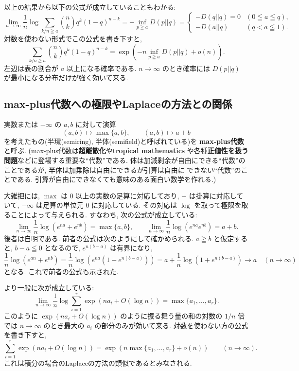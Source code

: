 \documentclass[12pt,twoside]{jarticle}
\theoremstyle{jplain}
\theoremstyle{jplain}
\theoremstyle{jplain}
\numberwithin{theorem}{section}
\numberwithin{equation}{section}
\numberwithin{figure}{section}
\numberwithin{table}{section}
\begin{document}
以上の結果から以下の公式が成立していることもわかる:
\[
\lim_{n\to\infty}
\frac{1}{n}\log\sum_{k/n\geqq a} \binom{n}{k}q^k(1-q)^{n-k}
=-\inf_{p\geqq a} D(p||q)
=
\begin{cases}
-D(q||q)=0 & (0\leqq a\leqq q), \\
-D(a||q)   & (q<a\leqq 1).
\end{cases}
\]
対数を使わない形式でこの公式を書き下すと,
\[
\sum_{k/n\geqq a} \binom{n}{k}q^k(1-q)^{n-k}
=
\exp\left(-n\inf_{p\geqq a}D(p||q) + o(n)\right).
\]
左辺は表の割合が $a$ 以上になる確率である.
$n\to\infty$ のとき確率には $D(p||q)$ が最小になる分布だけが強く効いて来る.



\subsection{max-plus代数への極限やLaplaceの方法との関係}

実数または $-\infty$ の $a,b$ に対して演算
\[
(a,b)\mapsto\max\{a,b\}, \qquad
(a,b)\mapsto a+b
\]
を考えたもの(半環(semiring), 半体(semifield)と呼ばれている)を
{\bf max-plus代数}と呼ぶ.
(max-plus代数は{\bf 超離散化}や{\bf tropical mathematics} 
や各種{\bf 正値性を扱う問題}などに登場する重要な``代数''である. 
体は加減剰余が自由にできる``代数''のことであるが, 
半体は加乗除は自由にできるが引算は自由に
できない``代数''のことである.
引算が自由にできなくても意味のある面白い数学を作れる.)

大雑把には, $\max$ は $0$ 以上の実数の足算に対応しており, 
$+$ は掛算に対応していて, $-\infty$ は足算の単位元 $0$ に対応している.
その対応は $\log$ を取って極限を取ることによって与えられる.
すなわち, 次の公式が成立している:
\[
\lim_{n\to\infty}\frac{1}{n}\log(e^{na}+e^{nb})=\max\{a,b\}, \qquad
\lim_{n\to\infty}\frac{1}{n}\log(e^{na}e^{nb})=a+b.
\]
後者は自明である.
前者の公式は次のようにして確かめられる. 
$a\geqq b$ と仮定すると, $b-a\leqq 0$ となるので, 
$e^{n(b-a)}$ は有界になり, 
\[
\frac{1}{n}\log(e^{an}+e^{nb})
=\frac{1}{n}\log\left(e^{na}\left(1+e^{n(b-a)}\right)\right)
=a+\frac{1}{n}\log\left(1+e^{n(b-a)}\right)
\to a
\quad (n\to\infty)
\]
となる. これで前者の公式も示された.

より一般に次が成立している:
\[
\lim_{n\to\infty}\frac{1}{n}\log\sum_{i=1}^r \exp(na_i+O(\log n)) 
= \max\{a_1,\ldots,a_r\}.
\]
このように $\exp(na_i+O(\log n))$ のように振る舞う量の和の対数の $1/n$ 倍では
$n\to\infty$ のとき最大の $a_i$ の部分のみが効いて来る.
対数を使わない方の公式を書き下すと, 
\[
\sum_{i=1}^r \exp(na_i+O(\log n))
=
\exp(n\max\{a_1,\ldots,a_r\}+o(n))
\qquad
(n\to\infty).
\]
これは積分の場合のLaplaceの方法の類似であるとみなされる.
\end{document}
